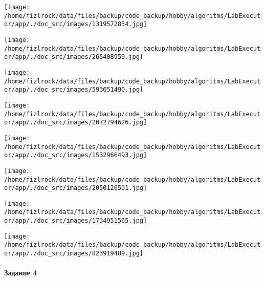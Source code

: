 \documentclass[a4paper, 12pt]{article}
\begin{document}
\texttt{[image: /home/fizlrock/data/files/backup/code\_backup/hobby/algoritms/LabExecutor/app/./doc\_src/images/1319572854.jpg]}

\texttt{[image: /home/fizlrock/data/files/backup/code\_backup/hobby/algoritms/LabExecutor/app/./doc\_src/images/265408959.jpg]}

\texttt{[image: /home/fizlrock/data/files/backup/code\_backup/hobby/algoritms/LabExecutor/app/./doc\_src/images/593651490.jpg]}

\texttt{[image: /home/fizlrock/data/files/backup/code\_backup/hobby/algoritms/LabExecutor/app/./doc\_src/images/2072794626.jpg]}

\texttt{[image: /home/fizlrock/data/files/backup/code\_backup/hobby/algoritms/LabExecutor/app/./doc\_src/images/1532966493.jpg]}

\texttt{[image: /home/fizlrock/data/files/backup/code\_backup/hobby/algoritms/LabExecutor/app/./doc\_src/images/2050126501.jpg]}

\texttt{[image: /home/fizlrock/data/files/backup/code\_backup/hobby/algoritms/LabExecutor/app/./doc\_src/images/1734951565.jpg]}

\texttt{[image: /home/fizlrock/data/files/backup/code\_backup/hobby/algoritms/LabExecutor/app/./doc\_src/images/823919489.jpg]}
\pagebreak
\paragraph{Задание 4}
\end{document}
